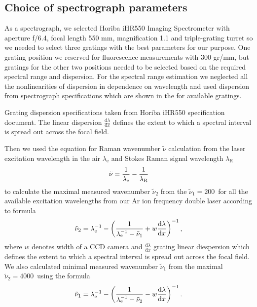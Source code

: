 \subsection{Choice of spectrograph parameters}

As a spectrograph, we selected Horiba iHR550 Imaging Spectrometer with aperture
f/6.4, focal length 550 mm, magnification 1.1 and triple-grating turret so we
needed to select three gratings with the best parameters for our purpose. One
grating position we reserved for fluorescence measurements with 300 gr/mm, but
gratings for the other two positions needed to be selected based on the
required spectral range and dispersion. For the spectral range estimation
we neglected all the nonlinearities of dispersion in dependence on wavelength
and used dispersion from spectrograph specifications which are shown in the
for available gratings.

\begin{table}
	\centering
	
	\caption{Grating dispersion specifications taken from Horiba iHR550
		specification document. The linear dispersion
		$\frac{\text{d}\lambda}{\text{d}x}$ defines the extent to which a spectral
		interval is spread out across the focal field.}
	\label{\tablabel{spectrograph_selection:dispersion_spec}}
\end{table}

Then we used the equation for Raman wavenumber $\tilde{\nu}$ calculation from
the laser excitation wavelength in the air $\lambda_\text{e}$ and Stokes Raman
signal wavelength $\lambda_\text{R}$
\begin{equation}
	\tilde{\nu} = \frac{1}{\lambda_\text{e}} - \frac{1}{\lambda_\text{R}}
	\label{\eqnlabel{spectrograph_selection:nu}}
\end{equation}
to calculate the maximal measured wavenumber $\tilde{\nu}_2$ from the
$\tilde{\nu}_1 = 200$\,\icm{} for all the available excitation wavelengths
from our Ar ion frequency double laser according to formula
\begin{equation}
	\tilde{\nu}_2 = \lambda_\text{e}^{-1}
		- \left(\frac{1}{\lambda_\text{e}^{-1} - \tilde{\nu}_1}
			+ w\frac{\text{d}\lambda}{\text{d}x}\right)^{-1},
	\label{\eqnlabel{spectrograph_selection:spectral_range_max_est}}
\end{equation}
where $w$ denotes width of a CCD camera and $\frac{\text{d}\lambda}{\text{d}x}$
grating linear diespersion which defines the extent to which a spectral
interval is spread out across the focal field. We also calculated minimal
measured wavenumber $\tilde{\nu}_1$ from the maximal
$\tilde{\nu}_2 = 4000$\,\icm{} using the formula
\begin{equation}
	\tilde{\nu}_1 = \lambda_\text{e}^{-1}
		- \left(\frac{1}{\lambda_\text{e}^{-1} - \tilde{\nu}_2}
			- w\frac{\text{d}\lambda}{\text{d}x}\right)^{-1}.
	\label{\eqnlabel{spectrograph_selection:spectral_range_min_est}}
\end{equation}

